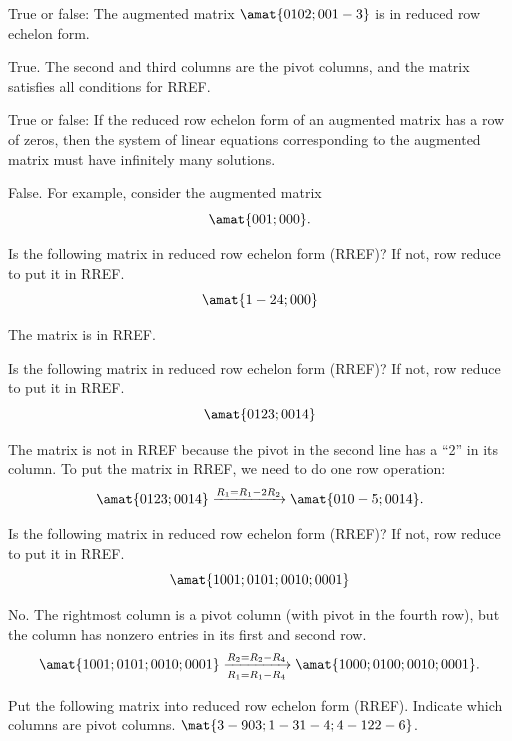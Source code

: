 \begin{problems}
\problem %
  True or false: The augmented matrix $\amat{0 1 0 2; 0 0 1 -3}$ is
  in reduced row echelon form. \newline
  \begin{solution}
      True.  The second and third columns are the pivot
      columns, and the matrix satisfies all conditions for RREF.
  \end{solution}
	
\problem %
    True or false: If the reduced row echelon form of an augmented matrix has a row of 
    zeros, then the system of linear equations corresponding to the 
    augmented matrix must have infinitely many solutions.
    \newline
    \begin{solution}
        False.  For example, consider the augmented matrix
	\[\amat{0 0 1; 0 0 0}.\]
    \end{solution}

\problem Is the following matrix in reduced row echelon
  form (RREF)?  If not, row reduce to put it in RREF. %
  \[\amat{1 -2 4; 0 0 0}\]
  \begin{solution}
    The matrix is in RREF. %
  \end{solution}

\problem Is the following matrix in reduced row echelon
  form (RREF)?  If not, row reduce to put it in RREF. %
  \[\amat{0 1 2 3; 0 0 1 4}\]
  \begin{solution}
    The matrix is not in RREF because the pivot in the second line has a ``2'' in its column.  To put the matrix in RREF, we need to do one row operation: 
    \[\amat{0 1 2 3; 0 0 1 4}
    \xrightarrow[]{R_1 = R_1 - 2 R_2}
    \amat{0 1 0 -5; 0 0 1 4}.\]
  \end{solution}

\problem Is the following matrix in reduced row echelon
  form (RREF)?  If not, row reduce to put it in RREF. %
  \[\amat{1 0 0 1; 0 1 0 1; 0 0 1 0; 0 0 0 1}\]
  \begin{solution}
    No.  The rightmost column is a pivot column (with
      pivot in the fourth row), but the column has nonzero entries in
      its first and second row.
      \[\amat{1 0 0 1; 0 1 0 1; 0 0 1 0; 0 0 0 1}
        \xrightarrow[R_1 = R_1 - R_4]{R_2 = R_2 - R_4}
        \amat{1 0 0 0; 0 1 0 0; 0 0 1 0; 0 0 0 1}.\]  
  \end{solution}
  
  \problem Put the following matrix into reduced row
  echelon form (RREF).  Indicate which columns are pivot columns.
  $\mat{3 -9 0 3; 1 -3 1 -4; 4 -12 2 -6}$.


\end{problems}
